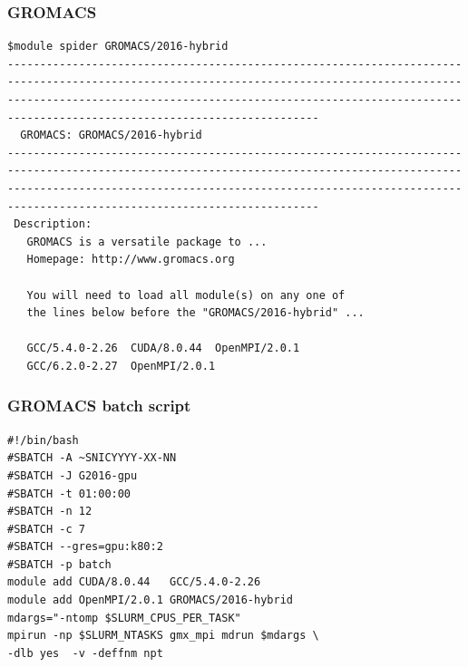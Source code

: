 \begin{frame}[fragile]
	\frametitle{GROMACS}
  
        \begin{verbatim}             
$module spider GROMACS/2016-hybrid 
------------------------------------------------------------------------------------------------------------------------------------------------------------------------------------------------------------------------------------------------------------------
  GROMACS: GROMACS/2016-hybrid
------------------------------------------------------------------------------------------------------------------------------------------------------------------------------------------------------------------------------------------------------------------
 Description:
   GROMACS is a versatile package to ... 
   Homepage: http://www.gromacs.org 

   You will need to load all module(s) on any one of 
   the lines below before the "GROMACS/2016-hybrid" ...

   GCC/5.4.0-2.26  CUDA/8.0.44  OpenMPI/2.0.1
   GCC/6.2.0-2.27  OpenMPI/2.0.1

        \end{verbatim}

\end{frame}


\begin{frame}[fragile]
	\frametitle{GROMACS batch script}
  
        \begin{verbatim}             
#!/bin/bash
#SBATCH -A ~SNICYYYY-XX-NN
#SBATCH -J G2016-gpu
#SBATCH -t 01:00:00
#SBATCH -n 12
#SBATCH -c 7
#SBATCH --gres=gpu:k80:2
#SBATCH -p batch
module add CUDA/8.0.44   GCC/5.4.0-2.26   
module add OpenMPI/2.0.1 GROMACS/2016-hybrid
mdargs="-ntomp $SLURM_CPUS_PER_TASK"
mpirun -np $SLURM_NTASKS gmx_mpi mdrun $mdargs \ 
-dlb yes  -v -deffnm npt
        \end{verbatim}

\end{frame}



